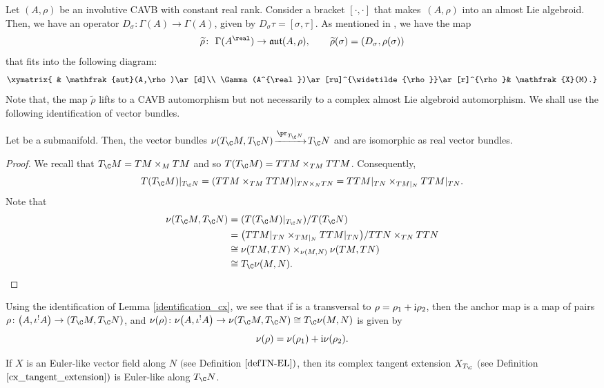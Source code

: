 Let $(A,\rho)$ be an involutive CAVB with constant real rank. Consider a bracket $[\cdot,\cdot]$ that makes~$(A,\rho)$ into an almost Lie algebroid. Then, we have an operator $D_{\sigma}\colon \Gamma(A)\to \Gamma(A)$, given by $D_{\sigma}\tau=[\sigma,\tau]$. As mentioned in \cite{bischoff2020deformation}, we have the map
\begin{gather*}
\widetilde{\rho}\colon \ \Gamma (A^{\real}) \to \mathfrak{aut}(A,\rho),\qquad
\widetilde{\rho}(\sigma)=(D_{\sigma}, \rho(\sigma))
\end{gather*}
that fits into the following diagram:
\begin{equation}{\label{lifting_aut}}
\xymatrix{
& \mathfrak{aut}(A,\rho)\ar[d]\\
\Gamma(A^{\real})\ar[ru]^{\widetilde{\rho}}\ar[r]^{\rho}& \mathfrak{X}(M).}
\end{equation}
Note that, the map $\widetilde{\rho}$ lifts to a CAVB automorphism but not necessarily to a complex almost Lie algebroid automorphism.
We shall use the following identification of vector bundles.
\begin{Lemma}\label{identification_cx}
Let  be a submanifold. Then, the vector bundles ${\nu(T_{\C}M,T_{\C}N)\!\xrightarrow{\pr_{T_{\C}N}}\! T_{\C}N}$ and  are isomorphic as real vector bundles.
\end{Lemma}
\begin{proof}
  We recall that $T_{\C}M=TM\times_M TM$ and so $ T(T_{\C}M)=TTM\times_{TM} TTM$. Consequently,
  \[ T(T_{\C}M)|_{T_{\C}N}=(TTM\times_{TM} TTM)|_{TN\times_{N}TN}=TTM|_{TN}\times_{TM|_N} TTM|_{TN}.\]
  Note that
  \begin{align*}
  \nu(T_{\C}M,T_{\C}N)&{}=(T(T_{\C}M)|_{T_{\C}N})/T(T_{\C}N)\\
  &{}=\bigl(TTM|_{TN}\times_{TM|_N} TTM|_{TN}\bigr)/TTN\times_{TN} TTN\\
  &{}\cong \nu(TM,TN)\times_{\nu(M,N)}\nu(TM,TN)\\
  &{}\cong T_{\C}\nu(M,N).
\tag*{\qed}
\end{align*}
\renewcommand{\qed}{}
\end{proof}

\begin{Remark}%
   Using the identification of Lemma \ref{identification_cx}, we see that if  is a transversal to $\rho=\rho_1+{\rm i}\rho_2$, then the anchor map is a map of pairs $\rho\colon \bigl(A,\iota^{!}A\bigr)\to (T_{\C}M, T_{\C}N)$, and $\nu(\rho)\colon \nu\bigl(A,\iota^{!}A\bigr)\to \nu(T_{\C}M, T_{\C}N)\cong T_{\C}\nu(M,N)$ is given by
  \[
  \nu(\rho)=\nu(\rho_1)+{\rm i}\nu(\rho_2).
  \]
\end{Remark}
\begin{Lemma}
   If $X$ is an Euler-like vector field along $N$ $($see Definition $\ref{defTN-EL})$, then its complex tangent extension $X_{T_{\C}}$ $($see Definition $\ref{cx_tangent_extension})$ is Euler-like along $T_{\C}N$.
\end{Lemma}

